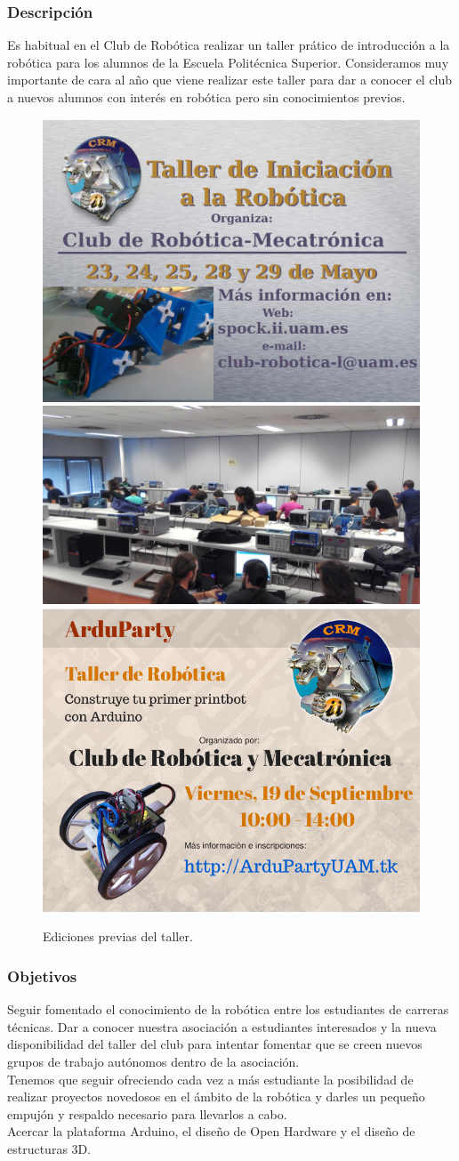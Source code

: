 \documentclass[12pt,twoside]{report}
\begin{document}
\subsubsection{Descripción}
Es habitual en el Club de Robótica realizar un taller prático de introducción a la robótica para los alumnos de la Escuela Politécnica Superior. Consideramos muy importante de cara al año que viene realizar este taller para dar a conocer el club a nuevos alumnos con interés en robótica pero sin conocimientos previos.
\begin{figure}[hbtp]
\centerline{\includegraphics[width=0.33\linewidth]{fotos/2012_taller_arduino_pantallas.jpg} \includegraphics[width=0.4\linewidth]{fotos/fotoParticipantesArduparty.jpg} \includegraphics[width=0.33\linewidth]{fotos/2014_Cartel_ArduParty.png}}
\caption*{
Ediciones previas del taller.
}
\end{figure}

\subsubsection{Objetivos}
Seguir fomentado el conocimiento de la robótica entre los estudiantes de carreras técnicas. Dar a conocer nuestra asociación a estudiantes interesados y la nueva disponibilidad del taller del club para intentar fomentar que se creen nuevos grupos de trabajo autónomos dentro de la asociación.\\
Tenemos que seguir ofreciendo cada vez a más estudiante la posibilidad de realizar proyectos novedosos en el ámbito de la robótica y darles un pequeño empujón y respaldo necesario para llevarlos a cabo.\\
Acercar la plataforma Arduino, el diseño de Open Hardware y el diseño de estructuras 3D.
\end{document}
